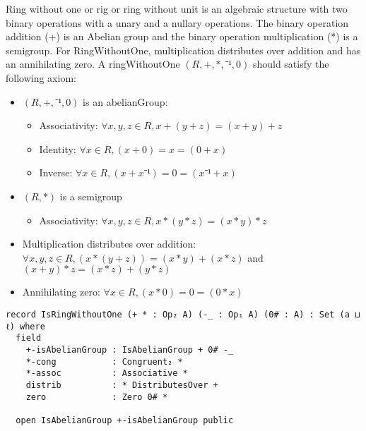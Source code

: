 Ring without one or rig or ring without unit is an algebraic structure with two
binary operations with a unary and a nullary operations. The binary operation
addition (+) is an Abelian group and the binary operation multiplication (*) is
a semigroup. For RingWithoutOne, multiplication distributes over addition and
has an annihilating zero. A ringWithoutOne $(R,+,*,⁻¹,0)$ should satisfy the
following axiom:
\begin{itemize}
  \item $(R,+,⁻¹,0)$ is an abelianGroup:
   \begin{itemize}
    \item Associativity: $\forall x,y,z \in R, x + (y + z) = (x + y) + z$
    \item Identity: $\forall x \in R, (x + 0) = x = (0 + x)$
    \item Inverse: $\forall x \in R, (x + x⁻¹) = 0 = (x⁻¹ + x)$
  \end{itemize}
  \item $(R,*)$ is a semigroup
  \begin{itemize}
    \item Associativity: $ \forall x,y,z \in R, x * (y*z)  = (x*y)*z$
  \end{itemize}
  \item Multiplication distributes over addition: \(\forall x , y , z \in R, (x * (y + z)) = (x * y) + (x
  * z)\) and \( (x + y) * z = (x * z) + (y * z) \)
  \item Annihilating zero: \(\forall x \in R, (x * 0) = 0 = (0 * x)\)
\end{itemize}

\begin{verbatim}
record IsRingWithoutOne (+ * : Op₂ A) (-_ : Op₁ A) (0# : A) : Set (a ⊔ ℓ) where
  field
    +-isAbelianGroup : IsAbelianGroup + 0# -_
    *-cong           : Congruent₂ *
    *-assoc          : Associative *
    distrib          : * DistributesOver +
    zero             : Zero 0# *

  open IsAbelianGroup +-isAbelianGroup public
\end{verbatim}
